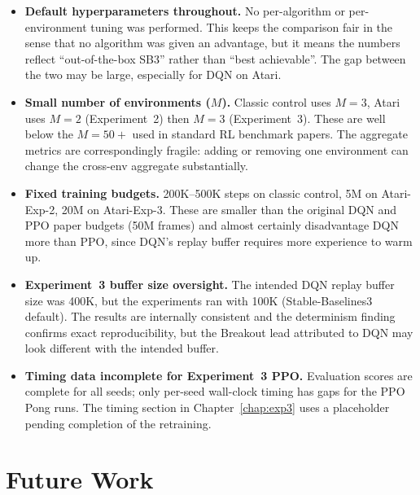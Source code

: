 \begin{itemize}
  \item \textbf{Default hyperparameters throughout.} No per-algorithm
  or per-environment tuning was performed. This keeps the comparison
  fair in the sense that no algorithm was given an advantage, but it
  means the numbers reflect ``out-of-the-box SB3'' rather than ``best
  achievable''. The gap between the two may be large, especially for
  DQN on Atari.
  \item \textbf{Small number of environments ($M$).} Classic control
  uses $M=3$, Atari uses $M=2$ (Experiment~2) then $M=3$
  (Experiment~3). These are well below the $M=50+$ used in standard RL
  benchmark papers. The aggregate metrics are correspondingly fragile:
  adding or removing one environment can change the cross-env aggregate
  substantially.
  \item \textbf{Fixed training budgets.} 200K--500K steps on classic
  control, 5M on Atari-Exp-2, 20M on Atari-Exp-3. These are smaller
  than the original DQN and PPO paper budgets (50M frames) and almost
  certainly disadvantage DQN more than PPO, since DQN's replay buffer
  requires more experience to warm up.
  \item \textbf{Experiment~3 buffer size oversight.} The intended DQN
  replay buffer size was 400K, but the experiments ran with 100K
  (Stable-Baselines3 default). The results are internally consistent
  and the determinism finding confirms exact reproducibility, but the
  Breakout lead attributed to DQN may look different with the intended
  buffer.
  \item \textbf{Timing data incomplete for Experiment~3 PPO.}
  Evaluation scores are complete for all seeds; only per-seed
  wall-clock timing has gaps for the PPO Pong runs. The timing section
  in Chapter~\ref{chap:exp3} uses a placeholder pending completion of
  the retraining.
\end{itemize}

\section{Future Work}

